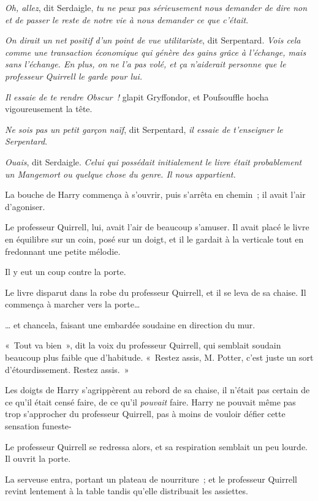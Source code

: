 \emph{Oh, allez}, dit Serdaigle, \emph{tu ne peux pas sérieusement nous demander de dire non et de passer le reste de notre vie à nous demander ce que c'était}.

\emph{On dirait un net positif d'un point de vue utilitariste}, dit Serpentard. \emph{Vois cela comme une transaction économique qui génère des gains grâce à l'échange, mais sans l'échange. En plus, on ne l'a pas volé, et ça n'aiderait personne que le professeur Quirrell le garde pour lui.}

\emph{Il essaie de te rendre Obscur~!} glapit Gryffondor, et Poufsouffle hocha vigoureusement la tête.

\emph{Ne sois pas un petit garçon naïf}, dit Serpentard, \emph{il essaie de t'enseigner le Serpentard}.

\emph{Ouais}, dit Serdaigle. \emph{Celui qui possédait initialement le livre était probablement un Mangemort ou quelque chose du genre. Il nous appartient.}

La bouche de Harry commença à s'ouvrir, puis s'arrêta en chemin~; il avait l'air d'agoniser.

Le professeur Quirrell, lui, avait l'air de beaucoup s'amuser. Il avait placé le livre en équilibre sur un coin, posé sur un doigt, et il le gardait à la verticale tout en fredonnant une petite mélodie.

Il y eut un coup contre la porte.

Le livre disparut dans la robe du professeur Quirrell, et il se leva de sa chaise. Il commença à marcher vers la porte…

… et chancela, faisant une embardée soudaine en direction du mur.

«~Tout va bien~», dit la voix du professeur Quirrell, qui semblait soudain beaucoup plus faible que d'habitude. «~Restez assis, M. Potter, c'est juste un sort d'étourdissement. Restez assis.~»

Les doigts de Harry s'agrippèrent au rebord de sa chaise, il n'était pas certain de ce qu'il était censé faire, de ce qu'il \emph{pouvait} faire. Harry ne pouvait même pas trop s'approcher du professeur Quirrell, pas à moins de vouloir défier cette sensation funeste-

Le professeur Quirrell se redressa alors, et sa respiration semblait un peu lourde. Il ouvrit la porte.

La serveuse entra, portant un plateau de nourriture~; et le professeur Quirrell revint lentement à la table tandis qu'elle distribuait les assiettes.

